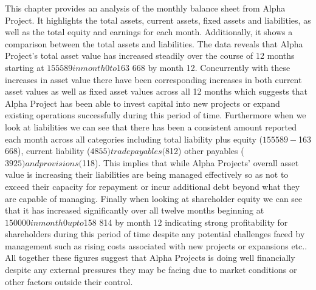  

This chapter provides an analysis of the monthly balance sheet from Alpha Project. It highlights the total assets, current assets, fixed assets and liabilities, as well as the total equity and earnings for each month. Additionally, it shows a comparison between the total assets and liabilities. The data reveals that Alpha Project's total asset value has increased steadily over the course of 12 months starting at $155 589 in month 0 to $163 668 by month 12. Concurrently with these increases in asset value there have been corresponding increases in both current asset values as well as fixed asset values across all 12 months which suggests that Alpha Project has been able to invest capital into new projects or expand existing operations successfully during this period of time. Furthermore when we look at liabilities we can see that there has been a consistent amount reported each month across all categories including total liability plus equity ($155 589 - $163 668), current liability ($4 855) trade payables ($812) other payables ($3 925) and provisions ($118). This implies that while Alpha Projects' overall asset value is increasing their liabilities are being managed effectively so as not to exceed their capacity for repayment or incur additional debt beyond what they are capable of managing. Finally when looking at shareholder equity we can see that it has increased significantly over all twelve months beginning at $150 000 in month 0 up to $158 814 by month 12 indicating strong profitability for shareholders during this period of time despite any potential challenges faced by management such as rising costs associated with new projects or expansions etc.. All together these figures suggest that Alpha Projects is doing well financially despite any external pressures they may be facing due to market conditions or other factors outside their control.